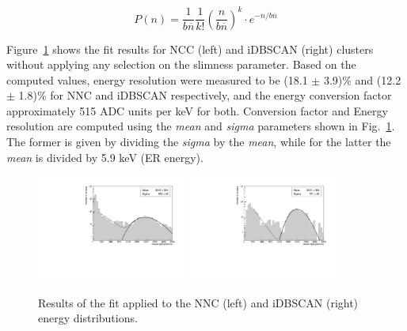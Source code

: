 \documentclass[a4paper,11pt]{article}
\begin{document}
\begin{equation}
   P(n)=\frac{1}{b\overline{n}}\frac{1}{k!}\left(\frac{n}{b\overline{n}}\right)^k \cdot e^{-n/b\overline{n}}
\label{fun:polya}
\end{equation}

Figure~\ref{fig_CosFe} shows the fit results for NCC (left) and iDBSCAN (right) clusters without applying any selection on the slimness parameter.
Based on the computed values, energy resolution were measured to be (18.1 $\pm$ 3.9)\% and (12.2 $\pm$ 1.8)\% for NNC and iDBSCAN respectively, and the energy conversion factor approximately 515 ADC units per keV for both.
Conversion factor and Energy resolution are computed using the \textit{mean} and \textit{sigma} parameters shown in Fig.~\ref{fig_CosFe}. 
The former is given by dividing the \textit{sigma} by the \textit{mean}, while for the latter the \textit{mean} is divided by 5.9 keV (ER energy).
%

\begin{figure}[ht]
\centering
\includegraphics[width=0.44\textwidth]{log_Resolution_NNC_0.pdf}
\includegraphics[width=0.44\textwidth]{log_Resolution_DB_0.pdf}
\caption{Results of the fit applied to the NNC (left) and iDBSCAN (right) energy distributions.}
\label{fig_CosFe}
\end{figure}


%

\end{document}

